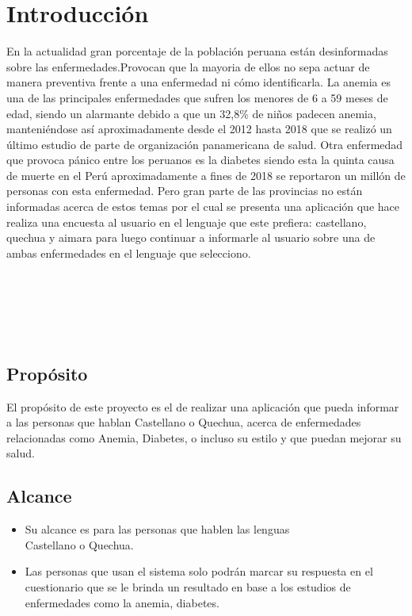 \chapter{Introducción}
En la actualidad gran porcentaje de la población peruana están desinformadas sobre las enfermedades.Provocan que la mayoria de ellos no sepa actuar de manera preventiva frente a una enfermedad ni cómo identificarla. La anemia es una de las principales enfermedades que sufren los menores de 6 a 59 meses de edad, siendo un alarmante debido a que un 32,8\% de niños padecen anemia, manteniéndose así aproximadamente desde el 2012 hasta 2018 que se realizó un último estudio de parte de organización panamericana de salud. Otra enfermedad que provoca pánico entre los peruanos es la diabetes siendo esta la quinta causa de muerte en el Perú aproximadamente a fines de 2018 se reportaron un millón de personas con esta enfermedad. Pero gran parte de las provincias no están informadas acerca de estos temas por el cual se presenta una aplicación que hace realiza una encuesta al usuario en el lenguaje que este prefiera: castellano, quechua y aimara para luego continuar a informarle al usuario sobre una de ambas enfermedades en el lenguaje que selecciono. 
\\
\\
\\
\\
\\
\\
\section{Propósito}
El propósito de este proyecto es el de realizar una aplicación que pueda informar a las personas que hablan Castellano o Quechua, acerca de enfermedades relacionadas como Anemia, Diabetes, o incluso su estilo y que puedan mejorar su salud.  
\section{Alcance}
\begin{itemize}
	\item Su alcance es para las personas que hablen las lenguas \\Castellano o Quechua.
	\item Las personas que usan el sistema solo podrán marcar su respuesta en el cuestionario que se le brinda un resultado en base a los estudios de enfermedades como la anemia, diabetes.
\end{itemize}

